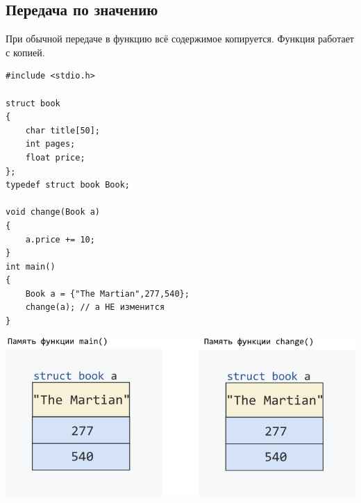 \documentclass{article}
\begin{document}
\subsection*{Передача по значению}
При обычной передаче в функцию всё содержимое копируется. Функция работает с копией.
\begin{multicols}{2}
\begin{lstlisting}
#include <stdio.h>

struct book 
{
    char title[50];
    int pages;
    float price;
};
typedef struct book Book;

void change(Book a) 
{
    a.price += 10;
}
int main()
{
    Book a = {"The Martian",277,540};
    change(a); // a НЕ изменится
}
\end{lstlisting}
\vfill\null
\columnbreak
\vspace*{3\baselineskip}
\begin{center}
\includegraphics[scale=0.5]{../images/structpassbyvalue.png}
\end{center}
\end{multicols}
\end{document}

